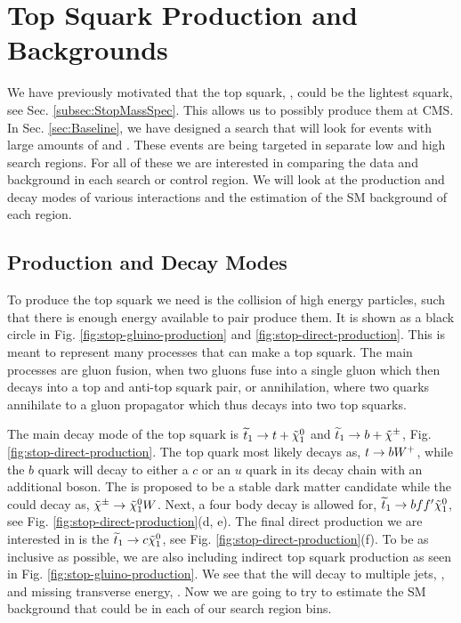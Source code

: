 \chapter{Top Squark Production and Backgrounds}
\label{ch:Search}

We have previously motivated that the top squark, \st{}, could be the lightest squark, see Sec. \ref{subsec:StopMassSpec}. This allows us to possibly produce them at CMS. In Sec. \ref{sec:Baseline}, we have designed a search that will look for events with large amounts of \met{} and \nj. These events are being targeted in separate low \dm{} and high \dm{} search regions. For all of these we are interested in comparing the data and background in each search or control region. We will look at the production and decay modes of various \st{} interactions and the estimation of the SM background of each region. 

\section{Production and Decay Modes}
\label{sec:Production}

To produce the top squark we need is the collision of high energy particles, such that there is enough energy available to pair produce them. It is shown as a black circle in Fig. \ref{fig:stop-gluino-production} and \ref{fig:stop-direct-production}. This is meant to represent many processes that can make a top squark. The main processes are gluon fusion, when two gluons fuse into a single gluon which then decays into a top and anti-top squark pair, or annihilation, where two quarks annihilate to a gluon propagator which thus decays into two top squarks. 



The main decay mode of the top squark is $\widetilde{t}_1\rightarrow t+\tilde{\chi}^{0}_{1}$ and $\widetilde{t}_1\rightarrow b+\tilde{\chi}^{\pm}$, Fig. \ref{fig:stop-direct-production}. The top quark most likely decays as, $t\rightarrow bW^+$, while the $b$ quark will decay to either a $c$ or an $u$ quark in its decay chain with an additional \W{} boson. The \neutralino{} is proposed to be a stable dark matter candidate while the \chargino{} could decay as, $\tilde{\chi}^{\pm}\rightarrow\tilde{\chi}^{0}_{1}W$. Next, a four body decay is allowed for, $\widetilde{t}_1\rightarrow b f f^\prime \tilde{\chi}^{0}_{1}$, see Fig. \ref{fig:stop-direct-production}(d, e). The final direct \st{} production we are interested in is the $\widetilde{t}_1\rightarrow c\tilde{\chi}^{0}_{1}$, see Fig. \ref{fig:stop-direct-production}(f). To be as inclusive as possible, we are also including indirect top squark production \cite{cms_collaboration_search_2013} as seen in Fig. \ref{fig:stop-gluino-production}. We see that the \st{} will decay to multiple jets, \nj, and missing transverse energy, \met. Now we are going to try to estimate the SM background that could be in each of our search region bins.

